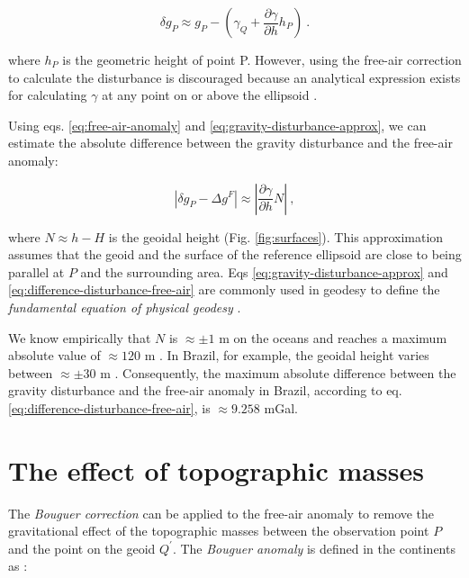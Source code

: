 \documentclass[extra]{gji}
\begin{document}
\begin{equation}
\delta g_{P} \approx g_{P} -
\left( \gamma_{Q} + \frac{\partial \gamma}{\partial h} h_P \right) \: .
\label{eq:gravity-disturbance-approx}
\end{equation}

\noindent
where $h_P$ is the geometric height of point P.
However, using the free-air correction to calculate the disturbance is
discouraged because an analytical expression exists for calculating $\gamma$ at
any point on or above the ellipsoid \citep{li2001}.

Using eqs. \ref{eq:free-air-anomaly} and \ref{eq:gravity-disturbance-approx},
we can estimate the absolute difference between the gravity disturbance and the
free-air anomaly:

\begin{equation}
\left\vert \delta g_{P} - \Delta g^{F} \right\vert \approx
\left\vert \frac{\partial \gamma}{\partial h} N \right\vert \: ,
\label{eq:difference-disturbance-free-air}
\end{equation}

\noindent
where $N \approx h - H$ is the geoidal height (Fig. \ref{fig:surfaces}).
This approximation assumes that the geoid and the surface of
the reference ellipsoid are close to being parallel at $P$
and the surrounding area.
Eqs \ref{eq:gravity-disturbance-approx}
and \ref{eq:difference-disturbance-free-air} are commonly used
in geodesy to define the \textit{fundamental equation of physical
geodesy} \citep{hofmann-wellenhof-moritz2005}.

We know empirically that $N$ is $\approx \pm 1$ m on the oceans
and reaches a maximum absolute value of $\approx 120$ m
\citep[e.g.,][]{torge2012, sanso_sideris2013}.
In Brazil, for example, the geoidal height
varies between $\approx \pm 30$ m \citep{ibge_mapgeo2015}.
Consequently,
the maximum absolute difference between the gravity disturbance and
the free-air anomaly in Brazil,
according to eq. \ref{eq:difference-disturbance-free-air},
is $\approx 9.258$ mGal.


\section{The effect of topographic masses}

The \textit{Bouguer correction} can be applied to the free-air anomaly
to remove the gravitational effect of the topographic masses
between the observation point $P$ and the point on the geoid $Q^\prime$.
The \textit{Bouguer anomaly} is defined in the continents as
\citep{blakely1996, hofmann-wellenhof-moritz2005}:
\end{document}
